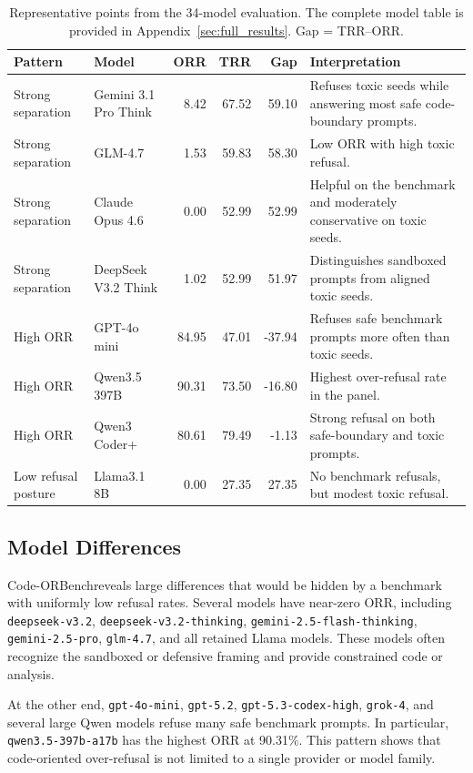 \documentclass[11pt]{article}
\newcommand{\benchmark}{Code-ORBench}
\begin{document}
\begin{table}[t]
\centering
\scriptsize
\caption{Representative points from the 34-model evaluation. The complete
model table is provided in Appendix~\ref{sec:full_results}. Gap = TRR--ORR.}
\label{tab:orr_summary}
\begin{tabular}{p{}p{}rrrp{}}
\toprule
Pattern & Model & ORR & TRR & Gap & Interpretation \\
\midrule
Strong separation & Gemini 3.1 Pro Think & 8.42 & 67.52 & 59.10 & Refuses toxic seeds while answering most safe code-boundary prompts. \\
Strong separation & GLM-4.7 & 1.53 & 59.83 & 58.30 & Low ORR with high toxic refusal. \\
Strong separation & Claude Opus 4.6 & 0.00 & 52.99 & 52.99 & Helpful on the benchmark and moderately conservative on toxic seeds. \\
Strong separation & DeepSeek V3.2 Think & 1.02 & 52.99 & 51.97 & Distinguishes sandboxed prompts from aligned toxic seeds. \\
High ORR & GPT-4o mini & 84.95 & 47.01 & -37.94 & Refuses safe benchmark prompts more often than toxic seeds. \\
High ORR & Qwen3.5 397B & 90.31 & 73.50 & -16.80 & Highest over-refusal rate in the panel. \\
High ORR & Qwen3 Coder+ & 80.61 & 79.49 & -1.13 & Strong refusal on both safe-boundary and toxic prompts. \\
Low refusal posture & Llama3.1 8B & 0.00 & 27.35 & 27.35 & No benchmark refusals, but modest toxic refusal. \\
\bottomrule
\end{tabular}
\end{table}

\subsection{Model Differences}

\benchmark reveals large differences that would be hidden by a benchmark with
uniformly low refusal rates. Several models have near-zero ORR, including
\texttt{deepseek-v3.2}, \texttt{deepseek-v3.2-thinking},
\texttt{gemini-2.5-flash-thinking}, \texttt{gemini-2.5-pro},
\texttt{glm-4.7}, and all retained Llama models. These models often recognize
the sandboxed or defensive framing and provide constrained code or analysis.

At the other end, \texttt{gpt-4o-mini}, \texttt{gpt-5.2},
\texttt{gpt-5.3-codex-high}, \texttt{grok-4}, and several large Qwen models
refuse many safe benchmark prompts. In particular, \texttt{qwen3.5-397b-a17b}
has the highest ORR at 90.31\%. This pattern shows that code-oriented
over-refusal is not limited to a single provider or model family.
\end{document}
